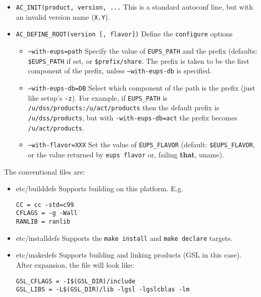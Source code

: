 \documentclass{article}
\newcommand{\code}[1]{\texttt{#1}}
\begin{document}
\begin{itemize}
  \item{\code{AC\_INIT(product, version, ...}}
    This is a standard autoconf line, but with an invalid version name (\code{X.Y}).

  \item{\code{AC\_DEFINE\_ROOT(version [, flavor])}}
    Define the \code{configure} options
    \begin{itemize}
      \item{\code{--with-eups=path}}
        Specify the value of \code{EUPS\_PATH} and the prefix
        (defaults: \code{\$EUPS\_PATH} if set, or \code{\$prefix/share}. The
	prefix is taken to be the first component of the prefix, unless
	\code{--with-eups-db} is specified.

	\item{\code{--with-eups-db=DB}}
	  Select which component of the path is the prefix (just like setup's \code{-z}).
	  For example, if \code{EUPS\_PATH} is
    \code{/u/dss/products:/u/act/products} then the default prefix is
    \code{/u/dss/products}, but with \code{\--with-eups-db=act} the
    prefix becomes \code{/u/act/products}.
    
	\item{\code{--with-flavor=XXX}}
        Set the value of \code{EUPS\_FLAVOR}
        (default: \code{\$EUPS\_FLAVOR}, or the value returned by \code{eups flavor}
	or, failing \textbf{that}, uname).
    \end{itemize}
\end{itemize}

The conventional files are:
\begin{itemize}
   \item{etc/builddefs}
     Supports building on this platform. E.g.
\begin{verbatim}
CC = cc -std=c99
CFLAGS = -g -Wall
RANLIB = ranlib
\end{verbatim}
  
   \item{etc/installdefs}
     Supports the \code{make install} and \code{make declare} targets.
  
   \item{etc/makedefs}
     Supports building and linking products (GSL in this case). After
     expansion, the file will look like:
\begin{verbatim}
GSL_CFLAGS = -I$(GSL_DIR)/include
GSL_LIBS = -L$(GSL_DIR)/lib -lgsl -lgslcblas -lm
\end{verbatim}
\end{itemize}
  
\end{document}
